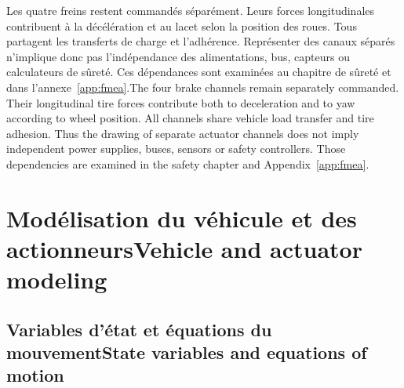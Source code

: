 \documentclass[11pt,a4paper,oneside]{report}
\newcommand{\bi}[2]{\iffrench #2\else #1\fi}
\newcommand{\chap}[2]{\chapter{\bi{#1}{#2}}}
\renewcommand{\sec}[2]{\section{\bi{#1}{#2}}}
\begin{document}
\bi{The four brake channels remain separately commanded. Their longitudinal tire forces contribute both to deceleration and to yaw according to wheel position. All channels share vehicle load transfer and tire adhesion. Thus the drawing of separate actuator channels does not imply independent power supplies, buses, sensors or safety controllers. Those dependencies are examined in the safety chapter and Appendix~\ref{app:fmea}.}{Les quatre freins restent commandés séparément. Leurs forces longitudinales contribuent à la décélération et au lacet selon la position des roues. Tous partagent les transferts de charge et l'adhérence. Représenter des canaux séparés n'implique donc pas l'indépendance des alimentations, bus, capteurs ou calculateurs de sûreté. Ces dépendances sont examinées au chapitre de sûreté et dans l'annexe~\ref{app:fmea}.}

\chap{Vehicle and actuator modeling}{Modélisation du véhicule et des actionneurs}
\sec{State variables and equations of motion}{Variables d'état et équations du mouvement}
\end{document}
